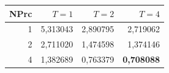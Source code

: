 \begin{tabular}{@{}rrrr@{}}
\toprule
NPrc & $T=1$ & $T=2$ & $T=4$ \\
\midrule
1 & 5{,}313043 & 2{,}890795 & 2{,}719062 \\
2 & 2{,}711020 & 1{,}474598 & 1{,}374146 \\
4 & 1{,}382689 & 0{,}763379 & \textbf{0{,}708088} \\
\bottomrule
\end{tabular}
